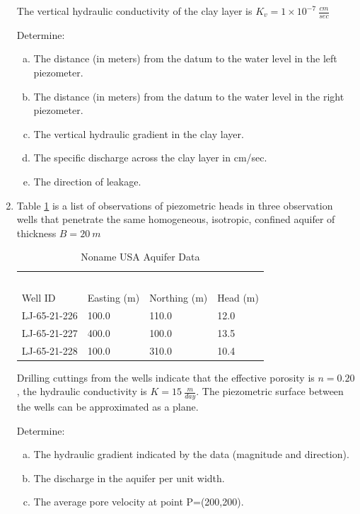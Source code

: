 \documentclass[12pt]{article}
\begin{document}
\begin{enumerate}
The vertical hydraulic conductivity of the clay layer is $K_v=1 \times 10^{-7}~\frac{cm}{sec}$

Determine:
    \begin{enumerate}[a)]
        \item The distance (in meters) from the datum to the water level in the left piezometer.
        \item The distance (in meters) from the datum to the water level in the right piezometer.
        \item The vertical hydraulic gradient in the clay layer.
        \item The specific discharge across the clay layer in cm/sec.
        \item The direction of leakage.
    \end{enumerate}

\clearpage
\item Table \ref{tab:ThreeWell} is a list of observations of piezometric heads in three observation wells that penetrate the same homogeneous, isotropic, confined aquifer of thickness $B=20~m$

\begin{table}[h!]
\centering
\caption{Noname USA Aquifer Data}
\begin{tabular}{p{1.0in}p{1.5in}p{1.5in}p{1.0in}} %
~&~\\
Well ID & Easting (m) & Northing (m) & Head (m) \\
\hline
\hline
LJ-65-21-226 & 100.0  &  110.0 & 12.0 \\
LJ-65-21-227 & 400.0 &  100.0 & 13.5 \\
LJ-65-21-228 & 100.0 &  310.0 & 10.4 \\
\hline
\end{tabular}
\label{tab:ThreeWell}
\end{table}

Drilling cuttings from the wells indicate that the effective porosity is $n=0.20$, the hydraulic conductivity is $K=15~\frac{m}{day}$.  The piezometric surface between the wells can be approximated as a plane.

Determine:
    \begin{enumerate}[a)]
        \item The hydraulic gradient indicated by the data (magnitude and direction).
        \item The discharge in the aquifer per unit width.
        \item The average pore velocity at point P=(200,200).
    \end{enumerate}


\end{enumerate}
\end{document}
